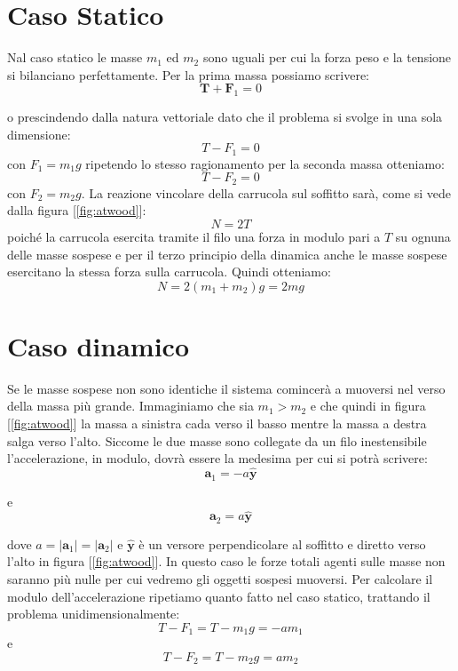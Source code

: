 \documentclass[a4paper,10pt,oneside]{article}
\begin{document}
\section*{Caso Statico}
Nal caso statico le masse $m_1$ ed $m_2$ sono uguali per cui la forza peso e la tensione si bilanciano perfettamente.
Per la prima massa possiamo scrivere:
\begin{equation}
 \mathbf{T}+\mathbf{F}_1=0
\end{equation}

o prescindendo dalla natura vettoriale dato che il problema si svolge in una sola dimensione:
\begin{equation}
 T-F_1=0
\end{equation}
con $F_1=m_1g$
ripetendo lo stesso ragionamento per la seconda massa otteniamo:
\begin{equation}
 T-F_2=0
\end{equation}
con $F_2=m_2g$. La reazione vincolare della carrucola sul soffitto sarà, come si vede dalla figura [\ref{fig:atwood}]:
\begin{equation}
 N=2T
\end{equation}
poiché la carrucola esercita tramite il filo una forza in modulo pari a $T$ su ognuna delle masse sospese e per il terzo principio della dinamica anche le masse sospese esercitano la stessa forza sulla carrucola.
Quindi otteniamo:
\begin{equation}
 N=2(m_1+m_2)g=2mg
\end{equation}

\section*{Caso dinamico}
Se le masse sospese non sono identiche il sistema comincerà a muoversi nel verso della massa più grande. Immaginiamo che sia $m_1>m_2$ e che quindi in figura [\ref{fig:atwood}] la massa a sinistra cada verso il basso mentre la massa a destra salga verso l'alto. Siccome le due masse sono collegate da un filo inestensibile l'accelerazione, in modulo, dovrà essere la medesima per cui si potrà scrivere:
\begin{equation}
 \mathbf{a}_1=-a\mathbf{\hat y}
\end{equation}

e
\begin{equation}
 \mathbf{a}_2=a\mathbf{\hat y}
\end{equation}

dove $a=|\mathbf{a}_1|=|\mathbf{a}_2|$ e $\mathbf{\hat y}$ è un versore  perpendicolare al soffitto e diretto verso l'alto in figura [\ref{fig:atwood}].
In questo caso le forze totali agenti sulle masse  non saranno più nulle per cui vedremo gli oggetti sospesi muoversi. Per calcolare il modulo dell'accelerazione ripetiamo quanto fatto nel caso statico, trattando il problema unidimensionalmente:
\begin{equation}
 T-F_1=T-m_1g=-am_1
\end{equation}
e
\begin{equation}
 T-F_2=T-m_2g=am_2
\end{equation}
\end{document}
